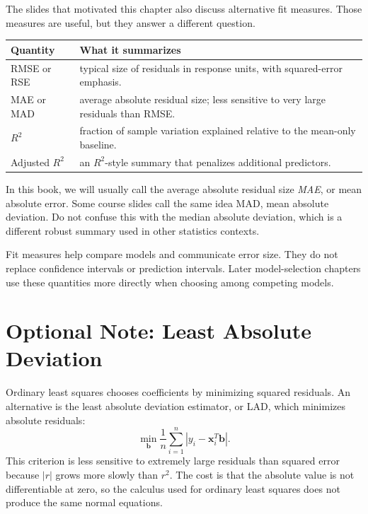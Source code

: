 The slides that motivated this chapter also discuss alternative fit measures.  Those measures are useful, but they answer a different question.

\begin{center}
\begin{tabular}{p{}p{}}
\toprule
\textbf{Quantity} & \textbf{What it summarizes} \\
\midrule
RMSE or RSE & typical size of residuals in response units, with squared-error emphasis. \\
MAE or MAD & average absolute residual size; less sensitive to very large residuals than RMSE. \\
\(R^2\) & fraction of sample variation explained relative to the mean-only baseline. \\
Adjusted \(R^2\) & an \(R^2\)-style summary that penalizes additional predictors. \\
\bottomrule
\end{tabular}
\end{center}

In this book, we will usually call the average absolute residual size \emph{MAE}, or mean absolute error.  Some course slides call the same idea MAD, mean absolute deviation.  Do not confuse this with the median absolute deviation, which is a different robust summary used in other statistics contexts.

Fit measures help compare models and communicate error size.  They do not replace confidence intervals or prediction intervals.  Later model-selection chapters use these quantities more directly when choosing among competing models.

\section{Optional Note: Least Absolute Deviation}

Ordinary least squares chooses coefficients by minimizing squared residuals.  An alternative is the least absolute deviation estimator, or LAD, which minimizes absolute residuals:
\begin{equation}
  \min_{\mathbf{b}} \frac{1}{n}\sum_{i=1}^n |y_i-\mathbf{x}_i^T\mathbf{b}|.
\end{equation}
This criterion is less sensitive to extremely large residuals than squared error because \(|r|\) grows more slowly than \(r^2\).  The cost is that the absolute value is not differentiable at zero, so the calculus used for ordinary least squares does not produce the same normal equations.

